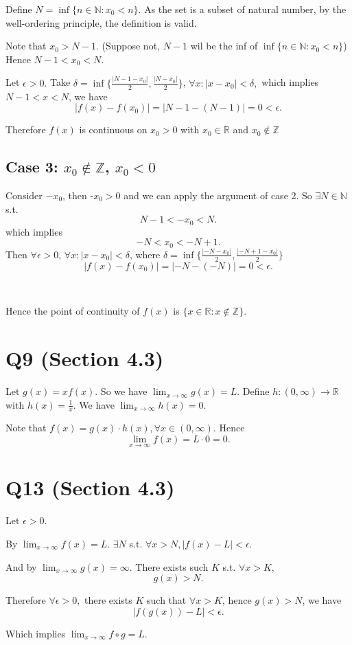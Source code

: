 \documentclass[12pt]{article}%
\begin{document}
Define $N=\inf\{n \in \mathbb{N}: x_0<n\}.$ As the set is a subset of natural number, by the well-ordering principle, the definition is valid. 

Note that $x_0>N-1.$ (Suppose not, $N-1$ wil be the inf of $\inf\{n \in \mathbb{N}: x_0<n\}$) Hence $N-1<x_0<N.$ 

Let $\epsilon >0.$ Take $\delta = \inf\{\frac{|N-1-x_0|}{2},\frac{|N-x_0|}{2}\}$, $\forall x:|x-x_0|<\delta,$ which implies $N-1<x<N$, we have $$|f(x)-f(x_0)|=|N-1-(N-1)|=0<\epsilon.$$ 

Therefore $f(x)$ is continuous on $x_0>0$ with $x_0 \in \mathbb{R}$ and $x_0 \not\in \mathbb{Z}$

\subsection{Case 3: $x_0 \not\in \mathbb{Z}$, $x_0<0$}
Consider $-x_0$, then -$x_0>0$ and we can apply the argument of case 2. So $\exists N \in \mathbb{N}$ s.t. $$N-1<-x_0<N.$$ which implies $$-N<x_0<-N+1.$$ Then $\forall \epsilon>0$, $\forall x:|x-x_0|<\delta$, where $\delta=\inf\{\frac{|-N-x_0|}{2},\frac{|-N+1-x_0|}{2}\}$ $$|f(x)-f(x_0)|=|-N-(-N)|=0<\epsilon.$$

~\

Hence the point of continuity of $f(x)$ is $\{ x \in \mathbb{R}: x \not\in \mathbb{Z}\}.$

\section{Q9 (Section 4.3)}
Let $g(x)=xf(x).$ So we have $\lim_{x \to \infty}g(x)=L.$ Define $h:(0,\infty) \to \mathbb{R}$ with $h(x)=\frac{1}{x}$. We have $\lim_{x \to \infty}h(x)=0.$ 

Note that $f(x)=g(x)\cdot h(x), \forall x\in (0,\infty).$ Hence $$\lim_{x \to \infty}f(x)=L\cdot 0=0.$$


\section{Q13 (Section 4.3)}
Let $\epsilon>0.$

By $\lim_{x \to \infty}f(x)=L.$ $\exists N$ s.t. $\forall x>N, |f(x)-L|<\epsilon.$

And by $\lim_{x \to \infty}g(x)=\infty.$ There exists such $K$ s.t. $\forall x>K$,$$ g(x)>N.$$

Therefore $\forall \epsilon>0,$ there exists $K$ such that $\forall x>K$, hence $g(x)>N$, we have $$|f(g(x))-L|<\epsilon.$$

Which implies $\lim_{x \to \infty}f\circ g=L.$
\end{document}
